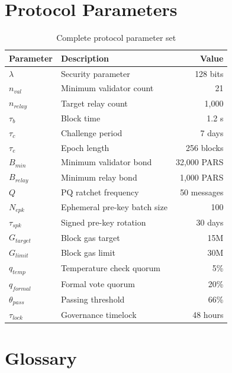 \documentclass[11pt,a4paper]{article}
\begin{document}
\section{Protocol Parameters}
\label{app:parameters}

\begin{table}[H]
\centering
\caption{Complete protocol parameter set}
\begin{tabular}{llr}
\toprule
\textbf{Parameter} & \textbf{Description} & \textbf{Value} \\
\midrule
$\lambda$ & Security parameter & 128 bits \\
$n_{val}$ & Minimum validator count & 21 \\
$n_{relay}$ & Target relay count & 1{,}000 \\
$\tau_b$ & Block time & 1.2 s \\
$\tau_c$ & Challenge period & 7 days \\
$\tau_e$ & Epoch length & 256 blocks \\
$B_{min}$ & Minimum validator bond & 32{,}000 PARS \\
$B_{relay}$ & Minimum relay bond & 1{,}000 PARS \\
$Q$ & PQ ratchet frequency & 50 messages \\
$N_{epk}$ & Ephemeral pre-key batch size & 100 \\
$\tau_{spk}$ & Signed pre-key rotation & 30 days \\
$G_{target}$ & Block gas target & 15M \\
$G_{limit}$ & Block gas limit & 30M \\
$q_{temp}$ & Temperature check quorum & 5\% \\
$q_{formal}$ & Formal vote quorum & 20\% \\
$\theta_{pass}$ & Passing threshold & 66\% \\
$\tau_{lock}$ & Governance timelock & 48 hours \\
\bottomrule
\end{tabular}
\end{table}

\section{Glossary}
\label{app:glossary}
\end{document}
